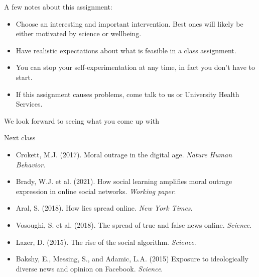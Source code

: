 \documentclass[aspectratio=169]{beamer}
\begin{document}
\begin{frame}

A few notes about this assignment:
\begin{itemize}
\item Choose an interesting and important intervention. Best ones will likely be either motivated by science or wellbeing. \pause
\item Have realistic expectations about what is feasible in a class assignment. \pause
\item You can stop your self-experimentation at any time, in fact you don't have to start. \pause
\item If this assignment causes problems, come talk to us or University Health Services.
\end{itemize}

\end{frame}
\begin{frame}

We look forward to seeing what you come up with

\end{frame}
\begin{frame}

Next class
\begin{itemize}
\item Crokett, M.J. (2017). Moral outrage in the digital age. \textit{Nature Human Behavior}.
\item Brady, W.J. et al. (2021). How social learning amplifies moral outrage expression in online social networks. \textit{Working paper}.
\item Aral, S. (2018). How lies spread online. \textit{New York Times}.
\item Vosoughi, S. et al. (2018). The spread of true and false news online. \textit{Science}.
\item Lazer, D. (2015). The rise of the social algorithm. \textit{Science}.
\item Bakshy, E., Messing, S., and Adamic, L.A. (2015) Exposure to ideologically diverse news and opinion on Facebook. \textit{Science}. 
\end{itemize}

\end{frame}
\end{document}
